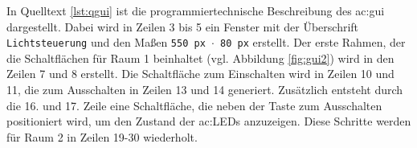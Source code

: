 \begin{figure}[H] %
\end{figure} %

In Quelltext \ref{lst:qgui} ist die programmiertechnische Beschreibung des \gls{ac:gui} dargestellt. Dabei wird in Zeilen 3 bis 5 ein Fenster mit der Überschrift \texttt{Lichtsteuerung} und den Maßen \texttt{550 px $\cdot$ 80 px} erstellt. Der erste Rahmen, der die Schaltflächen für Raum 1 beinhaltet (vgl. Abbildung \ref{fig:gui2}) wird in den Zeilen 7 und 8 erstellt. Die Schaltfläche zum Einschalten wird in Zeilen 10 und 11, die zum Ausschalten in Zeilen 13 und 14 generiert. Zusätzlich entsteht durch die 16. und 17. Zeile eine Schaltfläche, die neben der Taste zum Ausschalten positioniert wird, um den Zustand der \gls{ac:LED}s anzuzeigen. Diese Schritte werden für Raum 2 in Zeilen 19-30 wiederholt.\\[0,2cm]

